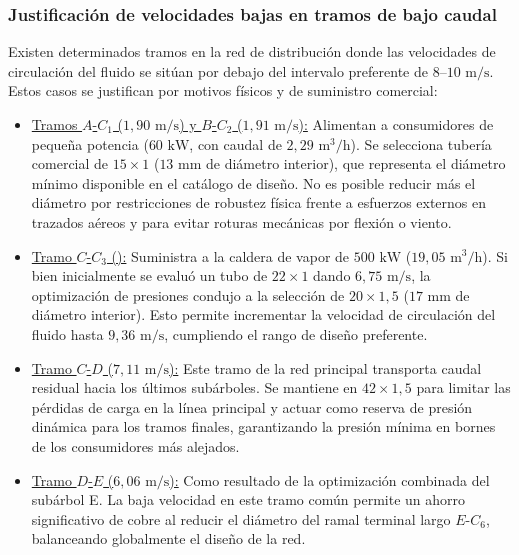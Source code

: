 \documentclass[12pt]{article}
\begin{document}
        \subsubsection{Justificación de velocidades bajas en tramos de bajo caudal}
        Existen determinados tramos en la red de distribución donde las velocidades de circulación del fluido se sitúan por debajo del intervalo preferente de $8\text{--}10\text{ m/s}$. Estos casos se justifican por motivos físicos y de suministro comercial:
        \begin{itemize}
            \item \underline{Tramos $A$-$C_1$ ($1,90\text{ m/s}$) y $B$-$C_2$ ($1,91\text{ m/s}$):} Alimentan a consumidores de pequeña potencia ($60\text{ kW}$, con caudal de $2,29\text{ m}^3\text{/h}$). Se selecciona tubería comercial de $15 \times 1$ ($13\text{ mm}$ de diámetro interior), que representa el diámetro mínimo disponible en el catálogo de diseño. No es posible reducir más el diámetro por restricciones de robustez física frente a esfuerzos externos en trazados aéreos y para evitar roturas mecánicas por flexión o viento.
            \item \underline{Tramo $C$-$C_3$ ():} Suministra a la caldera de vapor de $500\text{ kW}$ ($19,05\text{ m}^3\text{/h}$). Si bien inicialmente se evaluó un tubo de $22 \times 1$ dando $6,75\text{ m/s}$, la optimización de presiones condujo a la selección de $20 \times 1,5$ ($17\text{ mm}$ de diámetro interior). Esto permite incrementar la velocidad de circulación del fluido hasta $9,36\text{ m/s}$, cumpliendo el rango de diseño preferente.
            \item \underline{Tramo $C$-$D$ ($7,11\text{ m/s}$):} Este tramo de la red principal transporta caudal residual hacia los últimos subárboles. Se mantiene en $42 \times 1,5$ para limitar las pérdidas de carga en la línea principal y actuar como reserva de presión dinámica para los tramos finales, garantizando la presión mínima en bornes de los consumidores más alejados.
            \item \underline{Tramo $D$-$E$ ($6,06\text{ m/s}$):} Como resultado de la optimización combinada del subárbol E. La baja velocidad en este tramo común permite un ahorro significativo de cobre al reducir el diámetro del ramal terminal largo $E$-$C_6$, balanceando globalmente el diseño de la red.
        \end{itemize}
\end{document}
